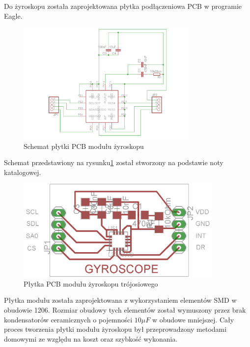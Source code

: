 Do żyroskopu została zaprojektowana płytka podłączeniowa PCB w programie Eagle.
\begin{figure}[!ht]
 \centering
 \includegraphics[height=60mm]{../images/ch04/L3G4200Dschematic.png}
 \caption{Schemat płytki PCB modułu żyroskopu}
 \label{fig:L3G4200DSchem}
\end{figure}

Schemat przedstawiony na rysunku\ref{fig:L3G4200DSchem} został stworzony na podstawie noty katalogowej.

\begin{figure}[!ht]
 \centering
 \includegraphics[height=50mm]{../images/ch04/L3G4200Dpcb.png}
 \caption{Płytka PCB modułu żyroskopu trójosiowego}
 \label{fig:L3G4200DPCB}
\end{figure}

Płytka modułu została zaprojektowana z wykorzystaniem elementów SMD w obudowie 1206. Rozmiar obudowy tych elementów został wymuszony przez brak kondensatorów ceramicznych o pojemności $10\mu F$ w obudowe mniejszej. Cały proces tworzenia płytki modułu żyroskopu był przeprowadzony metodami domowymi ze względu na koszt oraz szybkość wykonania. 
 

